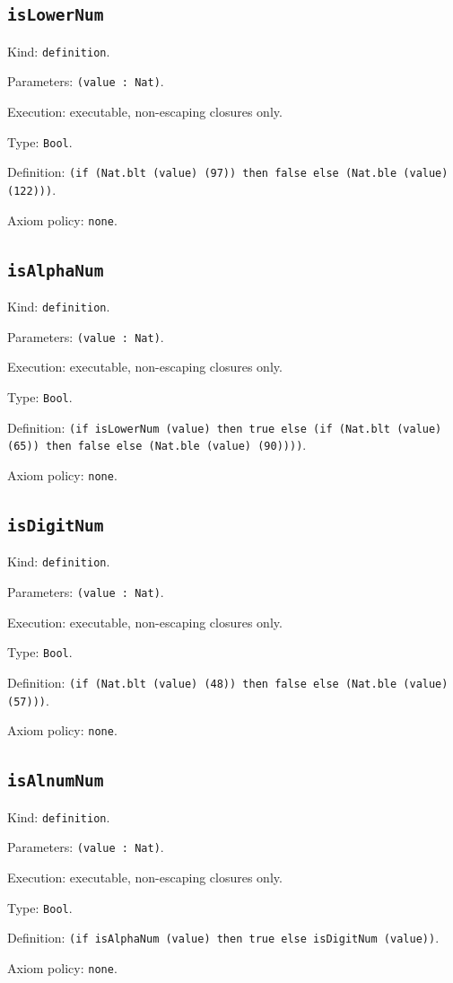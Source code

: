 \documentclass[11pt]{article}
\begin{document}
\subsection*{\texttt{isLowerNum}}
\noindent Kind: \texttt{definition}.\par
\noindent Parameters: \texttt{(value : Nat)}.\par
\noindent Execution: executable, non-escaping closures only.\par
\noindent Type: \texttt{Bool}.\par
\noindent Definition: \texttt{(if (Nat.blt (value) (97)) then false else (Nat.ble (value) (122)))}.\par
\noindent Axiom policy: \texttt{none}.\par
\subsection*{\texttt{isAlphaNum}}
\noindent Kind: \texttt{definition}.\par
\noindent Parameters: \texttt{(value : Nat)}.\par
\noindent Execution: executable, non-escaping closures only.\par
\noindent Type: \texttt{Bool}.\par
\noindent Definition: \texttt{(if isLowerNum (value) then true else (if (Nat.blt (value) (65)) then false else (Nat.ble (value) (90))))}.\par
\noindent Axiom policy: \texttt{none}.\par
\subsection*{\texttt{isDigitNum}}
\noindent Kind: \texttt{definition}.\par
\noindent Parameters: \texttt{(value : Nat)}.\par
\noindent Execution: executable, non-escaping closures only.\par
\noindent Type: \texttt{Bool}.\par
\noindent Definition: \texttt{(if (Nat.blt (value) (48)) then false else (Nat.ble (value) (57)))}.\par
\noindent Axiom policy: \texttt{none}.\par
\subsection*{\texttt{isAlnumNum}}
\noindent Kind: \texttt{definition}.\par
\noindent Parameters: \texttt{(value : Nat)}.\par
\noindent Execution: executable, non-escaping closures only.\par
\noindent Type: \texttt{Bool}.\par
\noindent Definition: \texttt{(if isAlphaNum (value) then true else isDigitNum (value))}.\par
\noindent Axiom policy: \texttt{none}.\par
\end{document}
